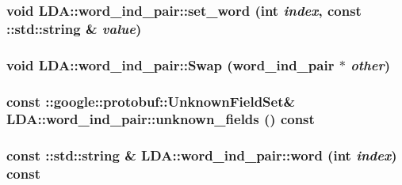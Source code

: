 \label{class_l_d_a_1_1word__ind__pair_ae4257eb3fbf2a14ab6c4037a4146f877}
\hypertarget{class_l_d_a_1_1word__ind__pair_a2fc3fdc684f33a6c8c4ef6f1d8de3400}{
\subsubsection[{set\_\-word}]{\setlength{\rightskip}{0pt plus 5cm}void LDA::word\_\-ind\_\-pair::set\_\-word (int {\em index}, \/  const ::std::string \& {\em value})}}
\label{class_l_d_a_1_1word__ind__pair_a2fc3fdc684f33a6c8c4ef6f1d8de3400}
\hypertarget{class_l_d_a_1_1word__ind__pair_a1feb41096844b321e264d3f5eb830699}{
\subsubsection[{Swap}]{\setlength{\rightskip}{0pt plus 5cm}void LDA::word\_\-ind\_\-pair::Swap ({\bf word\_\-ind\_\-pair} $\ast$ {\em other})}}
\label{class_l_d_a_1_1word__ind__pair_a1feb41096844b321e264d3f5eb830699}
\hypertarget{class_l_d_a_1_1word__ind__pair_aac377eba9af306e7c620360821feab15}{
\subsubsection[{unknown\_\-fields}]{\setlength{\rightskip}{0pt plus 5cm}const ::google::protobuf::UnknownFieldSet\& LDA::word\_\-ind\_\-pair::unknown\_\-fields () const}}
\label{class_l_d_a_1_1word__ind__pair_aac377eba9af306e7c620360821feab15}
\hypertarget{class_l_d_a_1_1word__ind__pair_a55bf7a00bb63ae558add53941e5b08e0}{
\subsubsection[{word}]{\setlength{\rightskip}{0pt plus 5cm}const ::std::string \& LDA::word\_\-ind\_\-pair::word (int {\em index}) const}}
